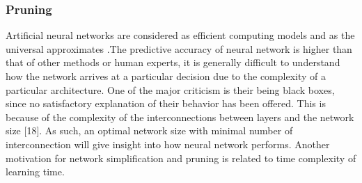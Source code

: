 \documentclass[a4paper,14pt,onecolumn]{article}
\begin{document}
\subsubsection{Pruning}
Artificial neural networks are considered as efficient computing models and as the universal approximates .The predictive accuracy of neural network is higher than that of other methods or human experts, it is generally difficult to understand how the network arrives at a particular decision due to the complexity of a particular architecture. One of the major criticism is their being black boxes, since no satisfactory explanation of their behavior has been offered. This is because of the complexity of the interconnections between layers and the network size [18]. As such, an optimal network size with minimal number of interconnection will give insight into how neural network performs. Another motivation for network simplification and pruning is related to time complexity of learning time.
\end{document}
